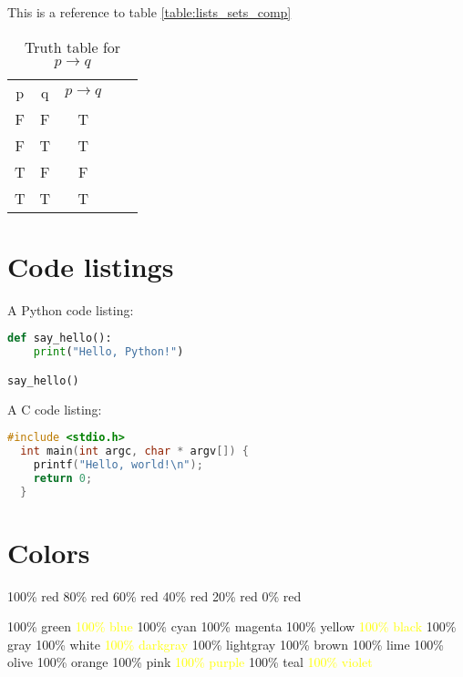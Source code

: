 \documentclass[12pt, letterpaper, oneside]{article}
\begin{document}
This is a reference to table \ref{table:lists_sets_comp}

\begin{table}[H]
  \centering
  \begin{tabular}{|c|c|c|ll}
    \cline{1-3}
    p & q & $p \rightarrow q$ &  & \\ [1ex] \cline{1-3}
    F & F & T                 &  & \\ [0.5ex] \cline{1-3}
    F & T & T                 &  & \\ [0.5ex] \cline{1-3}
    T & F & F                 &  & \\ [0.5ex] \cline{1-3}
    T & T & T                 &  & \\ [0.5ex] \cline{1-3}
  \end{tabular}
  \caption{Truth table for $p \rightarrow q$}
\end{table}

\section{Code listings}

A Python code listing:

\begin{lstlisting}[language=Python]
def say_hello():
    print("Hello, Python!")

say_hello()
\end{lstlisting}

A C code listing:

\begin{lstlisting}[language=C]
  #include <stdio.h>
  int main(int argc, char * argv[]) {
    printf("Hello, world!\n");
    return 0;
  }
\end{lstlisting}

\section{Colors}

\colorbox{red!100}{100\% red}
\colorbox{red!80}{80\% red}
\colorbox{red!60}{60\% red}
\colorbox{red!40}{40\% red}
\colorbox{red!20}{20\% red}
\colorbox{red!0}{0\% red}

\colorbox{green!100}{100\% green}
\colorbox{blue!100}{\textcolor{yellow}{100\% blue}}
\colorbox{cyan!100}{100\% cyan}
\colorbox{magenta!100}{100\% magenta}
\colorbox{yellow!100}{100\% yellow}
\colorbox{black!100}{\textcolor{yellow}{100\% black}}
\colorbox{gray!100}{100\% gray}
\colorbox{white!100}{100\% white}
\colorbox{darkgray!100}{\textcolor{yellow}{100\% darkgray}}
\colorbox{lightgray!100}{100\% lightgray}
\colorbox{brown!100}{100\% brown}
\colorbox{lime!100}{100\% lime}
\colorbox{olive!100}{100\% olive}
\colorbox{orange!100}{100\% orange}
\colorbox{pink!100}{100\% pink}
\colorbox{purple!100}{\textcolor{yellow}{100\% purple}}
\colorbox{teal!100}{100\% teal}
\colorbox{violet!100}{\textcolor{yellow}{100\% violet}}
\end{document}
